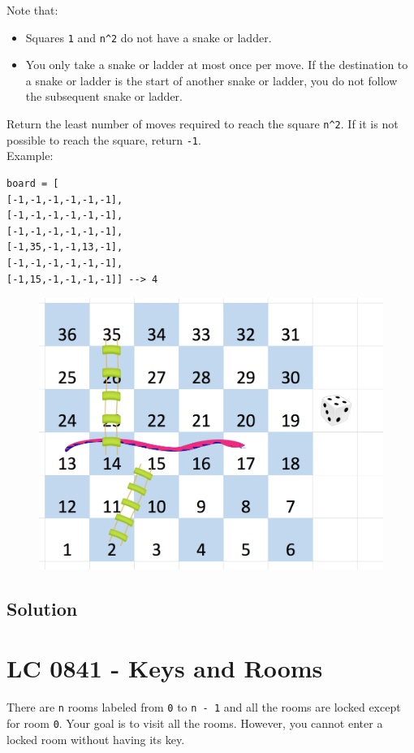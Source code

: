 Note that:
\begin{itemize}
	\item  Squares {\colorbox{CodeBackground}{\lstinline|1|}} and {\colorbox{CodeBackground}{\lstinline|n^2|}} do not have a snake or ladder.
	\item You only take a snake or ladder at most once per move. If the destination to a snake or ladder is the start of another snake or ladder, you do not follow the subsequent snake or ladder.
\end{itemize}

Return the least number of moves required to reach the square {\colorbox{CodeBackground}{\lstinline|n^2|}}. If it is not possible to reach the square, return {\colorbox{CodeBackground}{\lstinline|-1|}}.\\

Example:
\begin{lstlisting}
board = [
[-1,-1,-1,-1,-1,-1],
[-1,-1,-1,-1,-1,-1],
[-1,-1,-1,-1,-1,-1],
[-1,35,-1,-1,13,-1],
[-1,-1,-1,-1,-1,-1],
[-1,15,-1,-1,-1,-1]] --> 4
\end{lstlisting}

\begin{figure}[H]
	\centering
	\includegraphics[width=0.4\linewidth]{images/lc0909_example}
	\label{fig:lc0909example}
\end{figure}

\subsection*{Solution}

\section{LC 0841 - Keys and Rooms}
There are {\colorbox{CodeBackground}{\lstinline|n|}} rooms labeled from {\colorbox{CodeBackground}{\lstinline|0|}} to {\colorbox{CodeBackground}{\lstinline|n - 1|}} and all the rooms are locked except for room {\colorbox{CodeBackground}{\lstinline|0|}}. Your goal is to visit all the rooms. However, you cannot enter a locked room without having its key.\\


